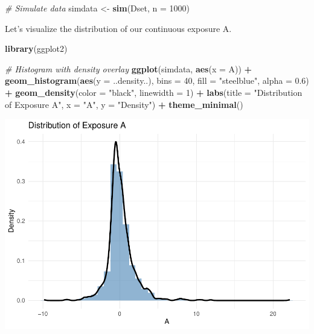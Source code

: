 \documentclass[
]{article}
\newenvironment{Shaded}{\begin{snugshade}}{\end{snugshade}}
\newcommand{\AttributeTok}[1]{\textcolor[rgb]{0.13,0.29,0.53}{#1}}
\newcommand{\CommentTok}[1]{\textcolor[rgb]{0.56,0.35,0.01}{\textit{#1}}}
\newcommand{\DecValTok}[1]{\textcolor[rgb]{0.00,0.00,0.81}{#1}}
\newcommand{\FloatTok}[1]{\textcolor[rgb]{0.00,0.00,0.81}{#1}}
\newcommand{\FunctionTok}[1]{\textcolor[rgb]{0.13,0.29,0.53}{\textbf{#1}}}
\newcommand{\NormalTok}[1]{#1}
\newcommand{\OtherTok}[1]{\textcolor[rgb]{0.56,0.35,0.01}{#1}}
\newcommand{\SpecialCharTok}[1]{\textcolor[rgb]{0.81,0.36,0.00}{\textbf{#1}}}
\newcommand{\StringTok}[1]{\textcolor[rgb]{0.31,0.60,0.02}{#1}}
\begin{document}
\begin{Shaded}
\begin{Highlighting}[]
\CommentTok{\# Simulate data}
\NormalTok{simdata }\OtherTok{\textless{}{-}} \FunctionTok{sim}\NormalTok{(Dset, }\AttributeTok{n =} \DecValTok{1000}\NormalTok{)}
\end{Highlighting}
\end{Shaded}

Let's visualize the distribution of our continuous exposure A.

\begin{Shaded}
\begin{Highlighting}[]
\FunctionTok{library}\NormalTok{(ggplot2)}

\CommentTok{\# Histogram with density overlay}
\FunctionTok{ggplot}\NormalTok{(simdata, }\FunctionTok{aes}\NormalTok{(}\AttributeTok{x =}\NormalTok{ A)) }\SpecialCharTok{+}
  \FunctionTok{geom\_histogram}\NormalTok{(}\FunctionTok{aes}\NormalTok{(}\AttributeTok{y =}\NormalTok{ ..density..), }\AttributeTok{bins =} \DecValTok{40}\NormalTok{, }\AttributeTok{fill =} \StringTok{"steelblue"}\NormalTok{, }\AttributeTok{alpha =} \FloatTok{0.6}\NormalTok{) }\SpecialCharTok{+}
  \FunctionTok{geom\_density}\NormalTok{(}\AttributeTok{color =} \StringTok{"black"}\NormalTok{, }\AttributeTok{linewidth =} \DecValTok{1}\NormalTok{) }\SpecialCharTok{+}
  \FunctionTok{labs}\NormalTok{(}\AttributeTok{title =} \StringTok{"Distribution of Exposure A"}\NormalTok{, }\AttributeTok{x =} \StringTok{"A"}\NormalTok{, }\AttributeTok{y =} \StringTok{"Density"}\NormalTok{) }\SpecialCharTok{+}
  \FunctionTok{theme\_minimal}\NormalTok{()}
\end{Highlighting}
\end{Shaded}

\includegraphics{simulation_files/figure-latex/plot-1.pdf}
\end{document}
